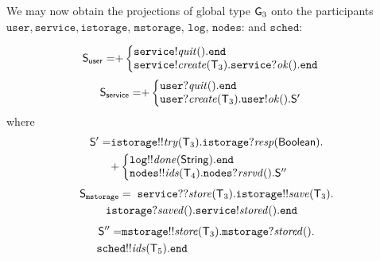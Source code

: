 \noindent
We may now obtain the projections of global type ${\sf G}_3$ onto the participants $\mathtt{user}, \mathtt{service}, \mathtt{istorage}$, $\mathtt{mstorage}$, $\mathtt{log}$, $\mathtt{nodes}$: and $\mathtt{sched}$:

\begin{align*}
\ST_\mathsf{user} = &
{+}
\left\{
\begin{array}{@{}l@{}}
\mathtt{service}{!}\mathit{quit}().\tend\\
\mathtt{service}{!}\mathit{create}(\T_3).\mathtt{service}{?}\mathit{ok}().\tend\\
\end{array} \right.
\end{align*}
\begin{align*}
	\ST_\mathsf{service} = &
	{+}
	\left\{
	\begin{array}{@{}l@{}}
	\mathtt{user}{?}\mathit{quit}().\tend \\
	\mathtt{user}{?}\mathit{create}(\T_3).\mathtt{user}{!}\mathit{ok}().\ST'\\
	\end{array} \right.
\end{align*}
where
\begin{align*}
	\ST' = &
	\mathtt{istorage}{!!}\mathit{try}(\T_3).\mathtt{istorage}{?}\mathit{resp}(\mathsf{Boolean}).\\
	&
	{+}
	\left\{
	\begin{array}{@{}l@{}}
	\mathtt{log}{!!}\mathit{done}(\mathsf{String}).\tend\\
	\mathtt{nodes}{!!}\mathit{ids}(\T_4).\mathtt{nodes}{?}\mathit{rsrvd}().\ST''\\
	\end{array} \right.
\end{align*}
\begin{align*}
	\ST_\mathtt{mstorage} =  & \hspace{2mm}
	\mathtt{service}{??}\mathit{store}(\T_3).\mathtt{istorage}{!!}\mathit{save}(\T_3).\\ & \hspace{-8mm}
	\mathtt{istorage}{?}\mathit{saved}().\mathtt{service}{!}\mathit{stored}().\tend
\end{align*}
\begin{align*}
	\ST'' = & 
	\mathtt{mstorage}{!!}\mathit{store}(\T_3).\mathtt{mstorage}{?}\mathit{stored}().\\ & \hspace{-8mm}
	\mathtt{sched}{!!}\mathit{ids}(\T_5).\tend
\end{align*}
